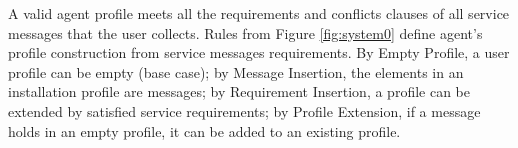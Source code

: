 \documentclass[compsoc, conference, letterpaper, 10pt, times]{IEEEtran}
\newtheorem{definition}{Definition}
\begin{document}
%


A valid agent profile meets all the requirements and conflicts clauses of all service messages that the user collects.
Rules from Figure \ref{fig:system0} define agent's profile construction from service messages requirements. By Empty Profile, a user profile can be empty (base case); by Message Insertion, the elements in an installation profile are messages; by Requirement Insertion, a profile can be extended by satisfied service requirements; by Profile Extension, if a message holds in an empty profile, it can be added to an existing profile. 
\end{document}
